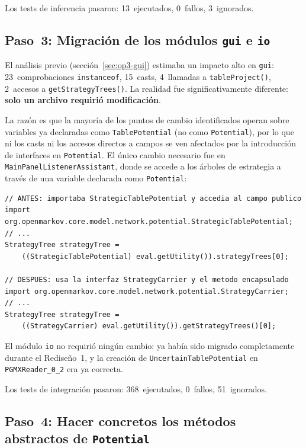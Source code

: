 \documentclass[11pt,a4paper]{article}
\newcommand{\code}[1]{\texttt{#1}}
\begin{document}
Los tests de inferencia pasaron: 13~ejecutados, 0~fallos, 3~ignorados.

\subsection{Paso~3: Migración de los módulos \code{gui} e \code{io}}
\label{sec:impl-paso3}

El análisis previo (sección~\ref{sec:op3-gui}) estimaba un impacto alto
en \code{gui}: 23~comprobaciones \code{instanceof}, 15~casts,
4~llamadas a \code{tableProject()}, 2~accesos a \code{getStrategyTrees()}.
La realidad fue significativamente diferente: \textbf{solo un archivo
requirió modificación}.

La razón es que la mayoría de los puntos de cambio identificados operan
sobre variables ya declaradas como \code{TablePotential} (no como
\code{Potential}), por lo que ni los casts ni los accesos directos a campos
se ven afectados por la introducción de interfaces en \code{Potential}.  El
único cambio necesario fue en \code{MainPanelListenerAssistant}, donde se
accede a los árboles de estrategia a través de una variable declarada
como \code{Potential}:

\begin{lstlisting}[caption={Único cambio en el módulo \code{gui} (Paso~3)}]
// ANTES: importaba StrategicTablePotential y accedia al campo publico
import org.openmarkov.core.model.network.potential.StrategicTablePotential;
// ...
StrategyTree strategyTree =
    ((StrategicTablePotential) eval.getUtility()).strategyTrees[0];

// DESPUES: usa la interfaz StrategyCarrier y el metodo encapsulado
import org.openmarkov.core.model.network.potential.StrategyCarrier;
// ...
StrategyTree strategyTree =
    ((StrategyCarrier) eval.getUtility()).getStrategyTrees()[0];
\end{lstlisting}

El módulo \code{io} no requirió ningún cambio: ya había sido migrado
completamente durante el Rediseño~1, y la creación de
\code{UncertainTablePotential} en \code{PGMXReader\_0\_2} era ya correcta.

Los tests de integración pasaron: 368~ejecutados, 0~fallos, 51~ignorados.

\subsection{Paso~4: Hacer concretos los métodos abstractos de \code{Potential}}
\label{sec:impl-paso4}
\end{document}
